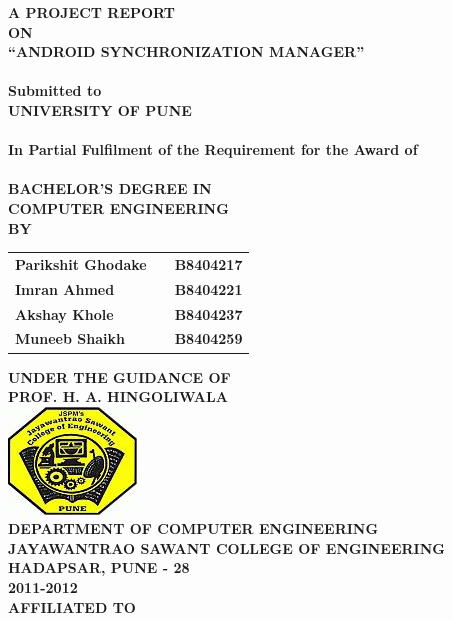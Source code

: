 \newpage
\begin{center}
\thispagestyle{empty}
\Large{\textbf{A PROJECT REPORT\\ON}}\\[0.3cm]
\Large{\textsc {\textbf{``ANDROID SYNCHRONIZATION MANAGER''}}}\\
\Large{\textbf{\\Submitted to}}
\LARGE{\textbf{\\UNIVERSITY OF PUNE\\}}
\large{\textbf{\\In Partial Fulfilment of the Requirement for the Award of\\}}
\LARGE{\textbf{\\BACHELOR'S DEGREE IN\\COMPUTER ENGINEERING}}
\vspace{0.3cm}
\Large{\textbf{\\BY}}\\[0.3cm]
\begin{table}[h]
\centering
\Large{
\begin{tabular}{>{\bfseries}lc>{\bfseries}r}
Parikshit Ghodake & & B8404217\\Imran Ahmed & & B8404221\\Akshay Khole & & B8404237\\Muneeb Shaikh & & B8404259\\
\end{tabular}}
\end{table}
\large{\textbf{UNDER THE GUIDANCE OF}}\\
\large{\textbf{PROF. H. A. HINGOLIWALA}}\\[0.5cm]
\includegraphics[scale=0.5]{project/images/jscoe_logo}\\
\large{\textbf{DEPARTMENT OF COMPUTER ENGINEERING}}\\
\Large{\textbf{JAYAWANTRAO SAWANT COLLEGE OF ENGINEERING}}\\
\large{\textbf{HADAPSAR, PUNE - 28}}
\large{\textbf{\\2011-2012}}\\[0.5cm]
\Large{\textbf{AFFILIATED TO}}\\[0.5cm]

\end{center}
